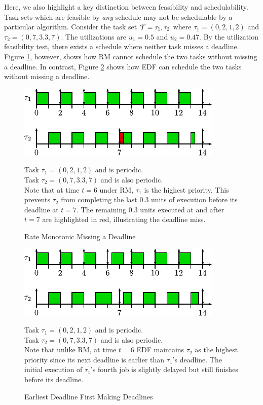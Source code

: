 Here, we also highlight a key distinction between feasibility and schedulability.
Task sets which are feasible by \textit{any} schedule may not be schedulable by a particular algorithm.
Consider the task set $\mathcal{T} = {\tau_1, \tau_2}$ where $\tau_1 = (0,2,1,2)$ and $\tau_2 = (0,7,3.3,7)$.
The utilizations are $u_1 = 0.5$ and $u_2 = 0.47$.
By the utilization feasibility test, there exists a schedule where neither task misses a deadline.
Figure \ref{fig:rmNotSchedulable}, however, shows how RM cannot schedule the two tasks without missing a deadline.
In contrast, Figure \ref{fig:edfSchedulable} shows how EDF can schedule the two tasks without missing a deadline.

\begin{figure}[!htbp]
    \centering
    \includegraphics[width=0.75\linewidth]{fig/rmNotSchedulable.pdf}
    \caption{Rate Monotonic Missing a Deadline}
    Task $\tau_1 = (0,2,1,2)$ and is periodic.\\
    Task $\tau_2 = (0,7,3.3,7)$ and is also periodic.\\
    Note that at time $t=6$ under RM, $\tau_1$ is the highest priority.
    This prevents $\tau_2$ from completing the last $0.3$ units of execution before its deadline at $t=7$.
    The remaining $0.3$ units executed at and after $t=7$ are highlighted in red, illustrating the deadline miss.
    \label{fig:rmNotSchedulable}
\end{figure}

\begin{figure}[!htbp]
    \centering
    \includegraphics[width=0.75\linewidth]{fig/edfSchedulable.pdf}
    \caption{Earliest Deadline First Making Deadlines}
    Task $\tau_1 = (0,2,1,2)$ and is periodic.\\
    Task $\tau_2 = (0,7,3.3,7)$ and is also periodic.\\
    Note that unlike RM, at time $t=6$ EDF maintains $\tau_2$ as the highest priority since its next deadline is earlier than $\tau_1$'s deadline.
    The initial execution of $\tau_1$'s fourth job is slightly delayed but still finishes before its deadline.
    \label{fig:edfSchedulable}
\end{figure}

